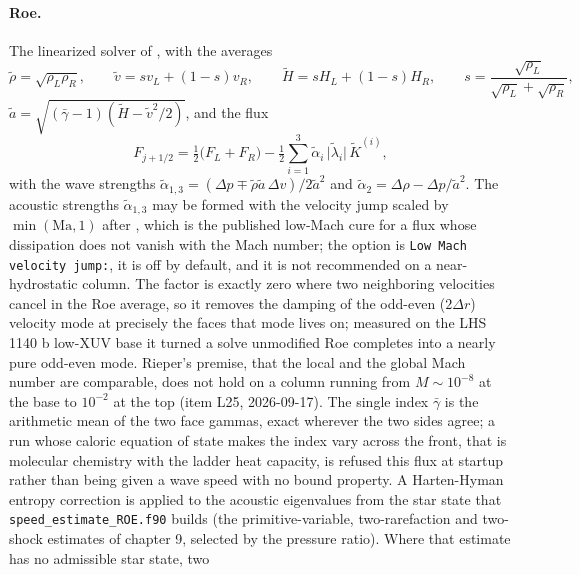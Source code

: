 \paragraph{Roe.}
The linearized solver of \citet{Roe1981}, with the averages
%
\begin{equation}
  \tilde\rho = \sqrt{\rho_L\rho_R},\qquad
  \tilde v = s v_L + (1-s) v_R,\qquad
  \tilde H = s H_L + (1-s) H_R,\qquad
  s = \frac{\sqrt{\rho_L}}{\sqrt{\rho_L}+\sqrt{\rho_R}},
  \label{eq:roe_avg}
\end{equation}
%
$\tilde a = \sqrt{(\bar\gamma-1)(\tilde H - \tilde v^2/2)}$, and the flux
%
\begin{equation}
  F_{j+1/2} = \tfrac12\bigl(F_L + F_R\bigr)
            - \tfrac12\sum_{i=1}^{3}\tilde\alpha_i\,
              \bigl|\tilde\lambda_i\bigr|\,\tilde K^{(i)},
  \label{eq:roeflux}
\end{equation}
%
with the wave strengths
$\tilde\alpha_{1,3} = (\Delta p \mp \tilde\rho\tilde a\,\Delta v)/2\tilde a^2$
and $\tilde\alpha_2 = \Delta\rho - \Delta p/\tilde a^2$.  The acoustic
strengths $\tilde\alpha_{1,3}$ may be formed with the velocity jump scaled by
$\min(\mathrm{Ma},1)$ after \citet{Rieper2011}, which is the published
low-Mach cure for a flux whose dissipation does not vanish with the Mach
number; the option is \texttt{Low Mach velocity jump:}, it is off by default,
and it is not recommended on a near-hydrostatic column. The factor is exactly
zero where two neighboring velocities cancel in the Roe average, so it removes
the damping of the odd-even ($2\Delta r$) velocity mode at precisely the faces
that mode lives on; measured on the LHS 1140 b low-XUV base it turned a solve
unmodified Roe completes into a nearly pure odd-even mode. Rieper's premise,
that the local and the global Mach number are comparable, does not hold on a
column running from $M\sim10^{-8}$ at the base to $10^{-2}$ at the top
(item L25, 2026-09-17).  The single index
$\bar\gamma$ is the arithmetic mean of the two face gammas, exact wherever
the two sides agree; a run whose caloric equation of state makes the index
vary across the front, that is molecular chemistry with the ladder heat
capacity, is refused this flux at startup rather than being given a wave
speed with no bound property.  A Harten-Hyman entropy correction is applied
to the acoustic eigenvalues from the star state that
\texttt{speed\_estimate\_ROE.f90} builds (the primitive-variable, two-rarefaction
and two-shock estimates of \citet{Toro2009} chapter 9, selected by the
pressure ratio).  Where that estimate has no admissible star state, two
